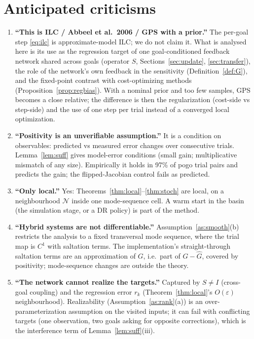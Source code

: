 \documentclass[11pt]{article}
\theoremstyle{definition}
\theoremstyle{remark}
\newcommand{\cN}{\mathcal{N}}
\newcommand{\Ghat}{\widehat G}
\begin{document}
\section{Anticipated criticisms}\label{sec:critique}
\begin{enumerate}[leftmargin=1.5em]
\item \textbf{``This is ILC / Abbeel et al.\ 2006 / GPS with a prior.''} The per-goal step \eqref{eq:ilc} is
  approximate-model ILC; we do not claim it. What is analysed here is its use as the regression target of one
  goal-conditioned feedback network shared across goals (operator $S$, Sections~\ref{sec:update}, \ref{sec:transfer}),
  the role of the network's own feedback in the sensitivity (Definition~\ref{def:G}), and the fixed-point contrast with
  cost-optimizing methods (Proposition~\ref{prop:regbias}). With a nominal prior and too few samples, GPS becomes a
  close relative; the difference is then the regularization (cost-side vs step-side) and the use of one step per trial
  instead of a converged local optimization.
\item \textbf{``Positivity is an unverifiable assumption.''} It is a condition on observables: predicted vs measured
  error changes over consecutive trials. Lemma~\ref{lem:suff} gives model-error conditions (small gain; multiplicative
  mismatch of any size). Empirically it holds in 97\% of pogo trial pairs and predicts the gain; the flipped-Jacobian
  control fails as predicted.
\item \textbf{``Only local.''} Yes: Theorems~\ref{thm:local}--\ref{thm:stoch} are local, on a neighbourhood $\cN$ inside one
  mode-sequence cell. A warm start in the basin (the simulation stage, or a DR policy) is part of the method.
\item \textbf{``Hybrid systems are not differentiable.''} Assumption~\ref{as:smooth}(b) restricts the analysis to a fixed
  transversal mode sequence, where the trial map is $C^1$ with saltation terms. The implementation's straight-through
  saltation terms are an approximation of $G$, i.e.\ part of $G-\Ghat$, covered by positivity; mode-sequence changes
  are outside the theory.
\item \textbf{``The network cannot realize the targets.''} Captured by $S\ne I$ (cross-goal coupling) and the regression
  error $r_k$ (Theorem~\ref{thm:local}'s $O(\varepsilon)$ neighbourhood). Realizability (Assumption~\ref{as:rank}(a)) is an
  over-parameterization assumption on the visited inputs; it can fail with conflicting targets (one observation, two
  goals asking for opposite corrections), which is the interference term of Lemma~\ref{lem:suff}(iii).

\end{enumerate}
\end{document}
